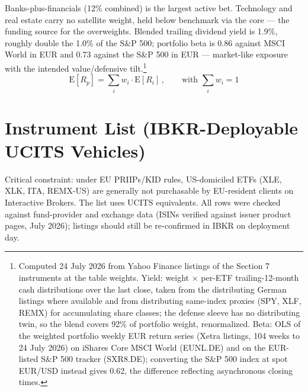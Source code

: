 \documentclass[11pt,a4paper]{article}
\begin{document}
Banks-plus-financials (12\% combined) is the largest active bet. Technology and real estate carry no satellite weight, held below benchmark via the core --- the funding source for the overweights. Blended trailing dividend yield is 1.9\%, roughly double the 1.0\% of the S\&P 500; portfolio beta is 0.86 against MSCI World in EUR and 0.73 against the S\&P 500 in EUR --- market-like exposure with the intended value/defensive tilt.\footnote{Computed 24 July 2026 from Yahoo Finance listings of the Section 7 instruments at the table weights. Yield: weight $\times$ per-ETF trailing-12-month cash distributions over the last close, taken from the distributing German listings where available and from distributing same-index proxies (SPY, XLF, REMX) for accumulating share classes; the defense sleeve has no distributing twin, so the blend covers 92\% of portfolio weight, renormalized. Beta: OLS of the weighted portfolio weekly EUR return series (Xetra listings, 104 weeks to 24 July 2026) on iShares Core MSCI World (EUNL.DE) and on the EUR-listed S\&P 500 tracker (SXR8.DE); converting the S\&P 500 index at spot EUR/USD instead gives 0.62, the difference reflecting asynchronous closing times.}
\[ \mathrm{E}[R_p] = \sum_i w_i \cdot \mathrm{E}[R_i]\,, \qquad \text{with } \sum_i w_i = 1 \]


\section{Instrument List (IBKR-Deployable UCITS Vehicles)}

Critical constraint: under EU PRIIPs/KID rules, US-domiciled ETFs (XLE, XLK, ITA, REMX-US) are generally not purchasable by EU-resident clients on Interactive Brokers. The list uses UCITS equivalents. All rows were checked against fund-provider and exchange data (ISINs verified against issuer product pages, July 2026); listings should still be re-confirmed in IBKR on deployment day.
\end{document}
